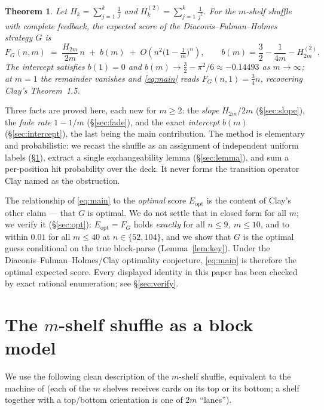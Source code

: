 \documentclass[11pt]{article}
\newtheorem{theorem}{Theorem}
\theoremstyle{definition}
\newcommand{\eopt}{E_{\mathrm{opt}}}
\newcommand{\Fg}{F_G}
\newcommand{\bigoh}{O}
\begin{document}
\begin{theorem}\label{thm:main}
Let $H_k=\sum_{j=1}^k \frac1j$ and $H_k^{(2)}=\sum_{j=1}^k \frac1{j^2}$. For the $m$-shelf
shuffle with complete feedback, the expected score of the Diaconis--Fulman--Holmes strategy
$G$ is
\begin{equation}\label{eq:main}
  \Fg(n,m)\;=\;\frac{H_{2m}}{2m}\,n\;+\;b(m)\;+\;\bigoh\!\left(n^2\bigl(1-\tfrac1m\bigr)^{n}\right),
  \qquad
  b(m)=\frac32-\frac1{4m}-H_{2m}^{(2)}.
\end{equation}
The intercept satisfies $b(1)=0$ and $b(m)\to \tfrac32-\pi^2/6\approx-0.14493$ as $m\to\infty$;
at $m=1$ the remainder vanishes and \eqref{eq:main} reads $\Fg(n,1)=\tfrac34 n$, recovering
Clay's Theorem~1.5.
\end{theorem}

Three facts are proved here, each new for $m\ge 2$: the \emph{slope} $H_{2m}/2m$
(\S\ref{sec:slope}), the \emph{fade rate} $1-1/m$ (\S\ref{sec:fade}), and the exact
\emph{intercept} $b(m)$ (\S\ref{sec:intercept}), the last being the main contribution. The
method is elementary and probabilistic: we recast the shuffle as an assignment of independent
uniform labels (\S\ref{sec:model}), extract a single exchangeability lemma
(\S\ref{sec:lemma}), and sum a per-position hit probability over the deck. It never forms the
transition operator Clay named as the obstruction.

The relationship of \eqref{eq:main} to the \emph{optimal} score $\eopt$ is the content of
Clay's other claim --- that $G$ is optimal. We do not settle that in closed form for all $m$;
we verify it (\S\ref{sec:opt}): $\eopt=\Fg$ holds \emph{exactly} for all $n\le 9,\ m\le 10$,
and to within $0.01$ for all $m\le 40$ at $n\in\{52,104\}$, and we show that $G$ is the
optimal guess conditional on the true block-parse (Lemma~\ref{lem:key}). Under the
Diaconis--Fulman--Holmes/Clay optimality conjecture, \eqref{eq:main} is therefore the optimal
expected score. Every displayed identity in this paper has been checked by exact rational
enumeration; see \S\ref{sec:verify}.

\section{The \texorpdfstring{$m$}{m}-shelf shuffle as a block model}\label{sec:model}

We use the following clean description of the $m$-shelf shuffle, equivalent to the machine of
\cite{DFH} (each of the $m$ shelves receives cards on its top or its bottom; a shelf together
with a top/bottom orientation is one of $2m$ ``lanes'').
\end{document}
